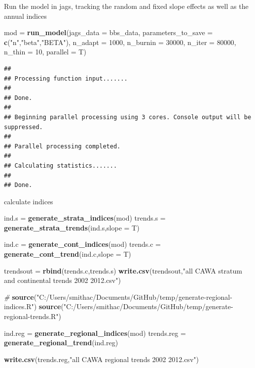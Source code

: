 \documentclass[]{article}
\newenvironment{Shaded}{\begin{snugshade}}{\end{snugshade}}
\newcommand{\KeywordTok}[1]{\textcolor[rgb]{0.13,0.29,0.53}{\textbf{#1}}}
\newcommand{\DataTypeTok}[1]{\textcolor[rgb]{0.13,0.29,0.53}{#1}}
\newcommand{\DecValTok}[1]{\textcolor[rgb]{0.00,0.00,0.81}{#1}}
\newcommand{\StringTok}[1]{\textcolor[rgb]{0.31,0.60,0.02}{#1}}
\newcommand{\CommentTok}[1]{\textcolor[rgb]{0.56,0.35,0.01}{\textit{#1}}}
\newcommand{\NormalTok}[1]{#1}
\begin{document}
Run the model in jags, tracking the random and fixed slope effects as
well as the annual indices

\begin{Shaded}
\begin{Highlighting}[]
\NormalTok{mod =}\StringTok{ }\KeywordTok{run_model}\NormalTok{(}\DataTypeTok{jags_data =}\NormalTok{ bbs_data,}
                \DataTypeTok{parameters_to_save =} \KeywordTok{c}\NormalTok{(}\StringTok{"n"}\NormalTok{,}\StringTok{"beta"}\NormalTok{,}\StringTok{"BETA"}\NormalTok{),}
                \DataTypeTok{n_adapt =} \DecValTok{1000}\NormalTok{,}
                \DataTypeTok{n_burnin =} \DecValTok{30000}\NormalTok{,}
                \DataTypeTok{n_iter =} \DecValTok{80000}\NormalTok{,}
                \DataTypeTok{n_thin =} \DecValTok{10}\NormalTok{,}
                \DataTypeTok{parallel =}\NormalTok{ T)}
\end{Highlighting}
\end{Shaded}

\begin{verbatim}
## 
## Processing function input....... 
## 
## Done. 
##  
## Beginning parallel processing using 3 cores. Console output will be suppressed.
## 
## Parallel processing completed.
## 
## Calculating statistics....... 
## 
## Done.
\end{verbatim}

calculate indices

\begin{Shaded}
\begin{Highlighting}[]
\NormalTok{ind.s =}\StringTok{ }\KeywordTok{generate_strata_indices}\NormalTok{(mod)}
\NormalTok{trends.s =}\StringTok{ }\KeywordTok{generate_strata_trends}\NormalTok{(ind.s,}\DataTypeTok{slope =}\NormalTok{ T)}


\NormalTok{ind.c =}\StringTok{ }\KeywordTok{generate_cont_indices}\NormalTok{(mod)}
\NormalTok{trends.c =}\StringTok{ }\KeywordTok{generate_cont_trend}\NormalTok{(ind.c,}\DataTypeTok{slope =}\NormalTok{ T)}

\NormalTok{trendsout =}\StringTok{ }\KeywordTok{rbind}\NormalTok{(trends.c,trends.s)}
\KeywordTok{write.csv}\NormalTok{(trendsout,}\StringTok{"all CAWA stratum and continental trends 2002 2012.csv"}\NormalTok{)}


\CommentTok{#}
\KeywordTok{source}\NormalTok{(}\StringTok{"C:/Users/smithac/Documents/GitHub/temp/generate-regional-indices.R"}\NormalTok{)}
\KeywordTok{source}\NormalTok{(}\StringTok{"C:/Users/smithac/Documents/GitHub/temp/generate-regional-trends.R"}\NormalTok{)}

\NormalTok{ind.reg =}\StringTok{ }\KeywordTok{generate_regional_indices}\NormalTok{(mod)}
\NormalTok{trends.reg =}\StringTok{ }\KeywordTok{generate_regional_trend}\NormalTok{(ind.reg)}

\KeywordTok{write.csv}\NormalTok{(trends.reg,}\StringTok{"all CAWA regional trends 2002 2012.csv"}\NormalTok{)}
\end{Highlighting}
\end{Shaded}
\end{document}
